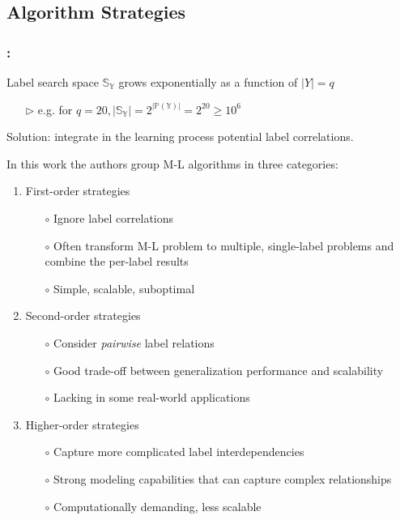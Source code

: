 \documentclass{beamer}
\begin{document}
\subsection{Algorithm Strategies}
\begin{frame}
\frametitle{\insertsection : \insertsubsection}
Label search space $\mathbb{S_Y}$ grows exponentially as a function of $|Y|=q$
\begin{itemize}
\item[$\triangleright$] e.g. for $q=20, |\mathbb{S_Y}| = 2 ^ {|\mathbb{P(Y)}|} = 2^{20} \ge 10^6$
\end{itemize}
Solution: integrate in the learning process potential label correlations.

In this work the authors group M-L algorithms in three categories:

\begin{enumerate}
\item First-order strategies
\begin{itemize}
\item[$\circ$] Ignore label correlations
\item[$\circ$] Often transform M-L problem to multiple, single-label problems
  and combine the per-label results
\item[$\circ$] Simple, scalable, suboptimal
\end{itemize}
\item Second-order strategies
\begin{itemize}
\item[$\circ$] Consider \emph{pairwise} label relations
\item[$\circ$] Good trade-off between generalization performance and scalability
\item[$\circ$] Lacking in some real-world applications
\end{itemize}
\item Higher-order strategies
\begin{itemize}
\item[$\circ$] Capture more complicated label interdependencies
\item[$\circ$] Strong modeling capabilities that can capture complex relationships
\item[$\circ$] Computationally demanding, less scalable
\end{itemize}

\end{enumerate}
\end{frame}

\end{document}
